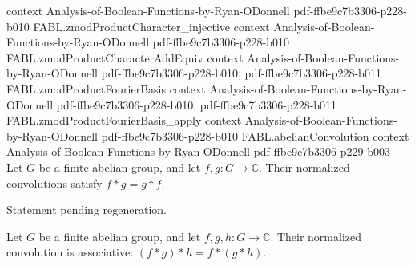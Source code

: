\begin{theorem}
  {context}
  {Analysis-of-Boolean-Functions-by-Ryan-ODonnell}
  {pdf-ffbe9c7b3306-p228-b010}
\proofstep
  {FABL.zmodProductCharacter_injective}
  {context}
  {Analysis-of-Boolean-Functions-by-Ryan-ODonnell}
  {pdf-ffbe9c7b3306-p228-b010}
\proofstep
  {FABL.zmodProductCharacterAddEquiv}
  {context}
  {Analysis-of-Boolean-Functions-by-Ryan-ODonnell}
  {pdf-ffbe9c7b3306-p228-b010,
    pdf-ffbe9c7b3306-p228-b011}
\proofstep
  {FABL.zmodProductFourierBasis}
  {context}
  {Analysis-of-Boolean-Functions-by-Ryan-ODonnell}
  {pdf-ffbe9c7b3306-p228-b010,
    pdf-ffbe9c7b3306-p228-b011}
\proofstep
  {FABL.zmodProductFourierBasis_apply}
  {context}
  {Analysis-of-Boolean-Functions-by-Ryan-ODonnell}
  {pdf-ffbe9c7b3306-p228-b010}
\proofstep
  {FABL.abelianConvolution}
  {context}
  {Analysis-of-Boolean-Functions-by-Ryan-ODonnell}
  {pdf-ffbe9c7b3306-p229-b003}
Let $G$ be a finite abelian group, and let $f,g:G\to\mathbb C$. Their normalized
convolutions satisfy $f*g=g*f$.
\end{theorem}

\begin{theorem}
\label{FABL.abelianConvolution_apply_swap}
\leanok
{}
Statement pending regeneration.
\end{theorem}

\begin{theorem}
\label{FABL.abelianConvolution_assoc}
\leanok
{}
Let $G$ be a finite abelian group, and let $f,g,h:G\to\mathbb C$. Their normalized
convolution is associative: $(f*g)*h=f*(g*h)$.
\end{theorem}

